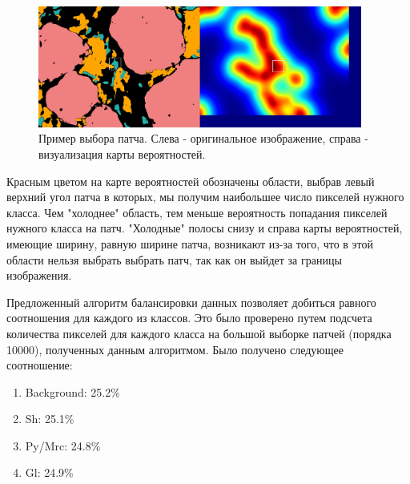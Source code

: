 \newline
\begin{figure}[H]
    \centering
    \includegraphics[width=0.95\textwidth]{pics/GL.jpg}
    \caption{Пример выбора патча. Слева - оригинальное изображение, справа - визуализация карты вероятностей.}
    \label{fig:algo}
\end{figure}
\par Красным цветом на карте вероятностей обозначены области, выбрав левый верхний угол патча в которых, мы получим наибольшее число пикселей нужного класса. Чем "холоднее" область, тем меньше вероятность попадания пикселей нужного класса на патч. "Холодные" полосы снизу и справа карты вероятностей, имеющие ширину, равную ширине патча, возникают из-за того, что в этой области нельзя выбрать выбрать патч, так как он выйдет за границы изображения.
\par Предложенный алгоритм балансировки данных позволяет добиться равного соотношения для каждого из классов. Это было проверено путем подсчета количества пикселей для каждого класса на большой выборке патчей (порядка 10000), полученных данным алгоритмом. Было получено следующее соотношение:
\begin{enumerate}[nosep]
    \item Background: 25.2\%
    \item Sh: 25.1\%
    \item Py/Mrc: 24.8\%
    \item Gl: 24.9\%
\end{enumerate}

\newpage
